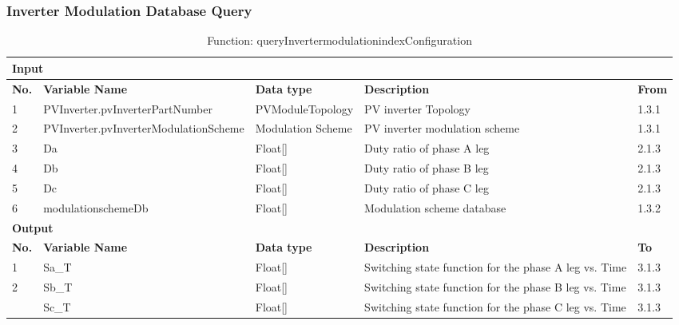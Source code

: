 \documentclass{article}
\begin{document}
\subsubsection{Inverter Modulation Database Query}
\begin{table}[h]
\centering
\caption{Function: queryInvertermodulationindexConfiguration}
\begin{tabular}{|l|p{4cm}|p{2cm}|p{5cm}|p{2cm}|}
\hline
\multicolumn{5}{|l|}{\textbf{Input}} \\ \hline
\textbf{No.} & \textbf{Variable Name} & \textbf{Data type} & \textbf{Description} & \textbf{From} \\ \hline
1 & PVInverter.pvInverterPartNumber & PVModuleTopology & PV inverter Topology & 1.3.1 \\ \hline
2 & PVInverter.pvInverterModulationScheme & Modulation Scheme & PV inverter modulation scheme & 1.3.1 \\ \hline
3 & Da & Float[] & Duty ratio of phase A leg & 2.1.3 \\ \hline
4 & Db & Float[] & Duty ratio of phase B leg & 2.1.3 \\ \hline
5 & Dc & Float[] & Duty ratio of phase C leg & 2.1.3 \\ \hline
6 & modulationschemeDb & Float[] & Modulation scheme database & 1.3.2 \\ \hline
\multicolumn{5}{|l|}{\textbf{Output}} \\ \hline
\textbf{No.} & \textbf{Variable Name} & \textbf{Data type} & \textbf{Description} & \textbf{To} \\ \hline
1 & Sa\_T & Float[] & Switching state function for the phase A leg vs. Time & 3.1.3 \\ \hline
2 & Sb\_T & Float[] & Switching state function for the phase B leg vs. Time & 3.1.3 \\ \hline
 & Sc\_T & Float[] & Switching state function for the phase C leg vs. Time & 3.1.3 \\ \hline
\end{tabular}
\end{table}
\end{document}
